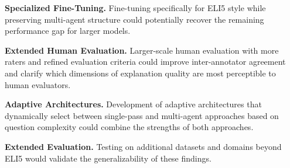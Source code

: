 \textbf{Specialized Fine-Tuning.} Fine-tuning specifically for ELI5 style while preserving multi-agent structure could potentially recover the remaining performance gap for larger models.

\textbf{Extended Human Evaluation.} Larger-scale human evaluation with more raters and refined evaluation criteria could improve inter-annotator agreement and clarify which dimensions of explanation quality are most perceptible to human evaluators.

\textbf{Adaptive Architectures.} Development of adaptive architectures that dynamically select between single-pass and multi-agent approaches based on question complexity could combine the strengths of both approaches.

\textbf{Extended Evaluation.} Testing on additional datasets and domains beyond ELI5 would validate the generalizability of these findings.
